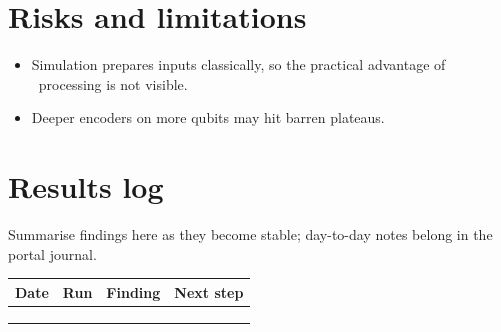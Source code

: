 \documentclass[11pt,a4paper]{article}
\begin{document}
\section{Risks and limitations}
\begin{itemize}
  \item Simulation prepares inputs classically, so the practical advantage of \QQ\ processing is not visible.
  \item Deeper encoders on more qubits may hit barren plateaus.
\end{itemize}

\section{Results log}
\label{sec:log}
Summarise findings here as they become stable; day-to-day notes belong in the portal journal.

\begin{table}[h]
\centering\small
\begin{tabularx}{\linewidth}{@{}l l >{\raggedright}X >{\raggedright\arraybackslash}X@{}}
\toprule
Date & Run & Finding & Next step \\
\midrule
 & & & \\
 & & & \\
 & & & \\
\bottomrule
\end{tabularx}
\end{table}



\end{document}
